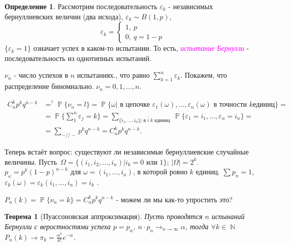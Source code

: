 \documentclass[a4paper,100pt]{article}
\theoremstyle{indented}
\newtheorem{theorem}{Теорема}
\theoremstyle{definition}
\newtheorem{defn}{Определение}
\theoremstyle{remark}
\DeclareMathOperator{\NN}{\mathbb{N}}
\DeclareMathOperator{\PP}{\mathbb{P}}
\begin{document}
\begin{defn}
  Рассмотрим последовательность $\varepsilon_k$ - независимых бернуллиевских величин (два исхода), $\varepsilon_k\sim B(1, p)$, 
  \begin{equation*}
      \varepsilon_k=
      \begin{cases}
          1, \: p \\ 
          0, \: q=1-p
      \end{cases}
  \end{equation*}
  $\{\varepsilon_k=1\}$ означает успех в каком-то испытании. То есть, \hypertarget{n12}{\textcolor{magenta}{\textit{испытание Бернулли}}} - последовательность из однотипных испытаний.
\end{defn}

$\nu_n$ - число успехов в $n$ испытаниях., что равно $\sum_{k=1}^n\varepsilon_k$. Покажем, что распределение биномиально. $\nu_n=0, 1, \ldots, n$.

\begin{equation*} 
  \begin{aligned}
      C_n^kp^kq^{n-k} & =^?\PP\{\nu_n=l\}=\PP\{\omega\vert \text{ в цепочке }\varepsilon_1(\omega), \ldots, \varepsilon_n(\omega)\text{ в точности } k \text{единиц}\}= \\ 
      & = \PP\{\sum_1^n\varepsilon_j=k\}=\sum_{\{i_1, \ldots, i_n\}| \text{ в } \bar{i} \: k \text{ единиц }}\PP\{\varepsilon_1= i_1, \ldots, \varepsilon_n=i_n\}= \\ 
      & = \sum_{-//-}p^kq^{n-k}=C_n^k p^kq^{n-k}.
  \end{aligned}
\end{equation*} 

Теперь встаёт вопрос: существуют ли независимые бернуллиевские случайные величины. Пусть $\Omega=\{(i_1, i_2, \ldots, i_n)|i_k=0 \text{ или }1\}$; $|\Omega|=2^k$. $p_{\omega}= p^k(1-p)^{n-k}$ для $\omega=(i_1, \ldots, i_n)$, в которой ровно $k$ единиц. $\sum p_n=1$, $\varepsilon_k(\omega)=\varepsilon_k(i_1, \ldots, i_n)=i_k$ .\

$P_n(k)=\PP\{\nu_n=k\}=C_n^kp^kq^{n-k}$ - можем ли мы как-то упростить это? \\

\begin{theorem}[Пуассоновская аппроксимация]
  Пусть проводятся $n$ испынаний Бернулли с веростностями успеха $p=p_n$, $n\cdot p_n\rightarrow_{n\rightarrow \infty} \alpha$, тогда $\forall k\in \NN$ $P_n(k)\rightarrow \pi_k=\frac{\alpha^k}{k!}e^{-\alpha}$. 
\end{theorem}
\end{document}
